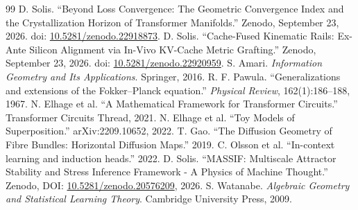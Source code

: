 \documentclass[11pt,twocolumn]{article}
\begin{document}
\begin{thebibliography}{99}
 D. Solis. ``Beyond Loss Convergence: The Geometric Convergence Index and the Crystallization Horizon of Transformer Manifolds.'' Zenodo, September 23, 2026. doi: \href{https://doi.org/10.5281/zenodo.22918873}{10.5281/zenodo.22918873}.
 D. Solis. ``Cache-Fused Kinematic Rails: Ex-Ante Silicon Alignment via In-Vivo KV-Cache Metric Grafting.'' Zenodo, September 23, 2026. doi: \href{https://doi.org/10.5281/zenodo.22920959}{10.5281/zenodo.22920959}.
 S. Amari. \textit{Information Geometry and Its Applications}. Springer, 2016.
 R. F. Pawula. ``Generalizations and extensions of the Fokker--Planck equation.'' \textit{Physical Review}, 162(1):186--188, 1967.
 N. Elhage et al. ``A Mathematical Framework for Transformer Circuits.'' Transformer Circuits Thread, 2021.
 N. Elhage et al. ``Toy Models of Superposition.'' arXiv:2209.10652, 2022.
 T. Gao. ``The Diffusion Geometry of Fibre Bundles: Horizontal Diffusion Maps.'' 2019.
 C. Olsson et al. ``In-context learning and induction heads.'' 2022.
 D. Solis. ``MASSIF: Multiscale Attractor Stability and Stress Inference Framework - A Physics of Machine Thought.'' Zenodo, DOI: \href{https://doi.org/10.5281/zenodo.20576209}{10.5281/zenodo.20576209}, 2026.
 S. Watanabe. \textit{Algebraic Geometry and Statistical Learning Theory}. Cambridge University Press, 2009.
\end{thebibliography}
\end{document}

